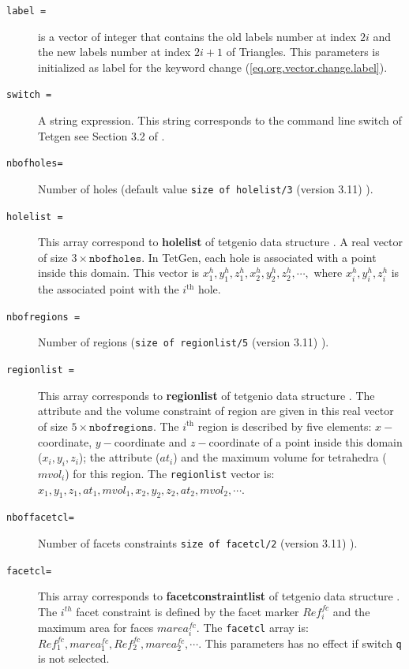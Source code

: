 \documentclass[a4paper,twoside,12pt]{book}
\begin{document}
\begin{description}
\item [\texttt{label =}] is a vector of integer that contains the old labels number at index $2i$  and the new labels number at index $2i+1$ of Triangles.
This parameters is initialized as label for the keyword change (\ref{eq.org.vector.change.label}).
\item [\texttt{switch  =}] A string expression. This string corresponds to the command line switch of Tetgen see Section 3.2 of \cite{tetgen}.
\item [\texttt{nbofholes=}] Number of holes (default value \verb!size of holelist/3! (version 3.11) ).
\item [\texttt{holelist =}] This array correspond to {\bf{holelist}} of tetgenio data structure \cite{tetgen}.
A real vector of size $3\times \texttt{nbofholes}$. In TetGen, each hole is associated with a point inside this domain.
This vector is $x_{1}^{h}, y_{1}^{h}, z_{1}^{h}, x_{2}^{h}, y_{2}^{h}, z_{2}^{h}, \cdots,$ where $x_{i}^{h},y_{i}^{h},z_{i}^{h}$
is the associated point with the $i^{\mathrm{th}}$ hole.
\item [\texttt{nbofregions =}] Number of regions (\verb!size of regionlist/5! (version 3.11) ). 
\item [\texttt{regionlist =}] This array corresponds to {\bf{regionlist}} of tetgenio data structure \cite{tetgen}.
The attribute and the volume constraint of region are given in this real vector of size $5\times \texttt{nbofregions}$.
The $i^{\mathrm{th}}$ region is described by five elements: $x-$coordinate, $y-$coordinate and $z-$coordinate of
a point inside this domain ($x_{i},y_{i},z_{i}$); the attribute ($at_{i}$) and the maximum volume for tetrahedra ($mvol_{i}$) for this region.
The \texttt{regionlist} vector is: $x_{1}, y_{1}, z_{1}, at_{1}, mvol_{1}, x_{2}, y_{2}, z_{2}, at_{2}, mvol_{2}, \cdots  $.
\item [\texttt{nboffacetcl=}] Number of facets constraints \verb!size of facetcl/2! (version 3.11) ).
\item [\texttt{facetcl=}] This array corresponds to {\bf{facetconstraintlist}} of tetgenio data structure \cite{tetgen}.
The $i^{th}$ facet constraint is defined by the facet marker $Ref_{i}^{fc}$ and the maximum area for faces $marea_{i}^{fc}$.
The \texttt{facetcl} array is: $Ref_{1}^{fc}, marea_{1}^{fc}, Ref_{2}^{fc}, marea_{2}^{fc}, \cdots$.
This parameters has no effect if switch \texttt{q} is not selected.
\end{description}
\end{document}
